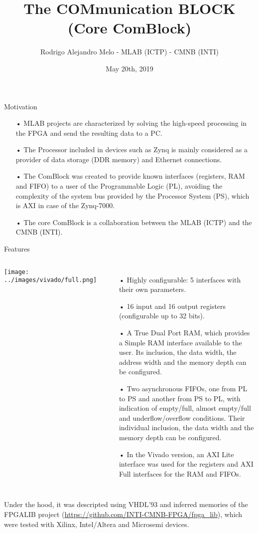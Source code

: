 \documentclass[11pt]{beamer}
\author{Rodrigo Alejandro Melo - MLAB (ICTP) - CMNB (INTI)}
\title{The COMmunication BLOCK (Core ComBlock)}
\institute{\tiny Advanced Workshop on Modern FPGA Based Technology for Scientific Computing | SMR 3289}
\date{May 20th, 2019}
\begin{document}
\begin{frame}
  \titlepage
\end{frame}

\begin{frame}{Motivation}
  \begin{itemize}
    \scriptsize
    \item[•] MLAB projects are characterized by solving the high-speed processing in the FPGA and send the resulting data to a PC.
    \item[•] The Processor included in devices such as Zynq is mainly considered as a provider of data storage (DDR memory) and Ethernet connections.
    \item[•] The ComBlock was created to provide known interfaces (registers, RAM and FIFO) to a user of the Programmable Logic (PL), avoiding the complexity of the system bus provided by the Processor System (PS), which is AXI in case of the Zynq-7000.
  \end{itemize}
  \vspace{15mm}
  \begin{itemize}
    \scriptsize
    \item[•] The core ComBlock is a collaboration between the MLAB (ICTP) and the CMNB (INTI).
  \end{itemize}
\end{frame}

\begin{frame}{Features}
  \begin{columns}
      \center
      \texttt{[image: ../images/vivado/full.png]}
      \begin{itemize}
        \tiny
        \item[•] Highly configurable: 5 interfaces with their own parameters.
        \item[•] 16 input and 16 output registers (configurable up to 32 bits).
        \item[•] A True Dual Port RAM, which provides a Simple RAM interface available to the user. Its inclusion, the data width, the address width and the memory depth can be configured.
        \item[•] Two asynchronous FIFOs, one from PL to PS and another from PS to PL, with indication of empty/full, almost empty/full and underflow/overflow conditions. Their individual inclusion, the data width and the memory depth can be configured.
        \item[•] In the Vivado version, an AXI Lite interface was used for the registers and AXI Full interfaces for the RAM and FIFOs.
      \end{itemize}
  \end{columns}
  \vspace{5mm}
  \scriptsize
  Under the hood, it was descripted using VHDL'93 and inferred memories of the FPGALIB project (\url{https://github.com/INTI-CMNB-FPGA/fpga_lib}), which were tested with Xilinx, Intel/Altera and Microsemi devices.
\end{frame}
\end{document}
